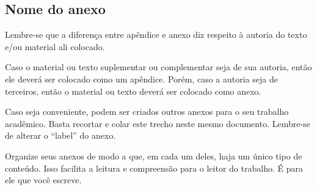 
\begin{anexosenv}
    \partanexos


    \chapter{Nome do anexo}
    \label{chap:anexo_a}

    Lembre-se que a diferença entre apêndice e anexo diz respeito à autoria do texto e/ou material ali colocado.

    Caso o material ou texto suplementar ou complementar seja de sua autoria, então ele deverá ser colocado como um apêndice.
    Porém, caso a autoria seja de terceiros, então o material ou texto deverá ser colocado como anexo.

    Caso seja conveniente, podem ser criados outros anexos para o seu trabalho acadêmico.
    Basta recortar e colar este trecho neste mesmo documento.
    Lembre-se de alterar o ``label'' do anexo.

    Organize seus anexos de modo a que, em cada um deles, haja um único tipo de conteúdo.
    Isso facilita a leitura e compreensão para o leitor do trabalho. É para ele que você escreve.

\end{anexosenv}
